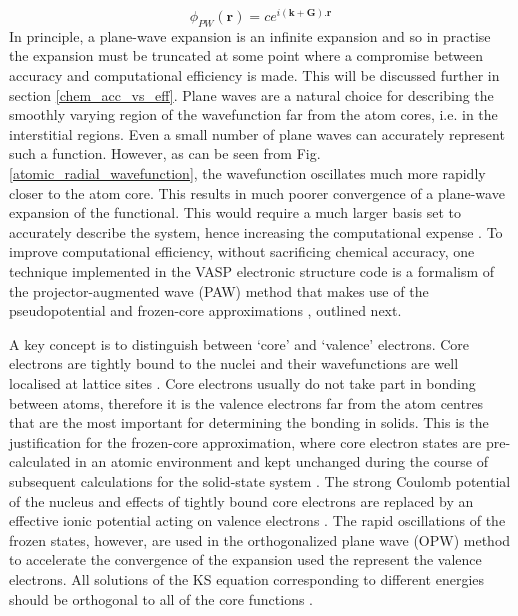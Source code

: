\documentclass[11pt, twoside]{report}
\begin{document}
\begin{equation}\label{vasp_basis_set}
\phi_{PW}(\mathbf{r}) = ce^{i(\mathbf{k}+\mathbf{G}).\mathbf{r}}
\end{equation}
In principle, a plane-wave expansion is an infinite expansion and so in practise the expansion must be truncated at some point where a compromise between accuracy and computational efficiency is made. This will be discussed further in section \ref{chem_acc_vs_eff}. Plane waves are a natural choice for describing the smoothly varying region of the wavefunction far from the atom cores, i.e. in the interstitial regions. Even a small number of plane waves can accurately represent such a function. However, as can be seen from Fig. \ref{atomic_radial_wavefunction}, the wavefunction oscillates much more rapidly closer to the atom core. This results in much poorer convergence of a plane-wave expansion of the functional. This would require a much larger basis set to accurately describe the system, hence increasing the computational expense \cite{Prasad_ch5}. To improve computational efficiency, without sacrificing chemical accuracy, one technique implemented in the VASP electronic structure code is a formalism of the projector-augmented wave (PAW) method \cite{PAW} that makes use of the pseudopotential and frozen-core approximations \cite{PAW_VASP}, outlined next.

A key concept is to distinguish between `core' and `valence' electrons. Core electrons are tightly bound to the nuclei and their wavefunctions are well localised at lattice sites \cite{Prasad_ch5}. Core electrons usually do not take part in bonding between atoms, therefore it is the valence electrons far from the atom centres that are the most important for determining the bonding in solids. This is the justification for the frozen-core approximation, where core electron states are pre-calculated in an atomic environment and kept unchanged during the course of subsequent calculations for the solid-state system \cite{vasp_slides_PP1}. The strong Coulomb potential of the nucleus and effects of tightly bound core electrons are replaced by an effective ionic potential acting on valence electrons \cite{RichardMartin_Ch11}. The rapid oscillations of the frozen states, however, are used in the orthogonalized plane wave (OPW) method to accelerate the convergence of the expansion used the represent the valence electrons. All solutions of the KS equation corresponding to different energies should be orthogonal to all of the core functions \cite{Prasad_ch5}.
\end{document}
